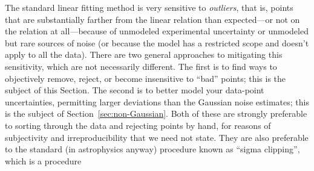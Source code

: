 \documentclass[12pt,twoside]{article}
\newcommand{\sectionname}{Section}
\begin{document}
The standard linear fitting method is very sensitive to
\emph{outliers}, that is, points that are substantially farther from
the linear relation than expected---or not on the relation at
all---because of unmodeled experimental uncertainty or unmodeled but
rare sources of noise (or because the model has a restricted scope and
doesn't apply to all the data).  There are two general approaches to
mitigating this sensitivity, which are not necessarily different.  The
first is to find ways to objectively remove, reject, or become
insensitive to ``bad'' points; this is the subject of
this \sectionname.  The second is to better model your data-point
uncertainties, permitting larger deviations than the Gaussian noise
estimates; this is the subject of
\sectionname~\ref{sec:non-Gaussian}.  Both of these are strongly
preferable to sorting through the data and rejecting points by hand,
for reasons of subjectivity and irreproducibility that we need not
state.  They are also preferable to the standard (in astrophysics
anyway) procedure known as ``sigma clipping'', which is a procedure
\end{document}

